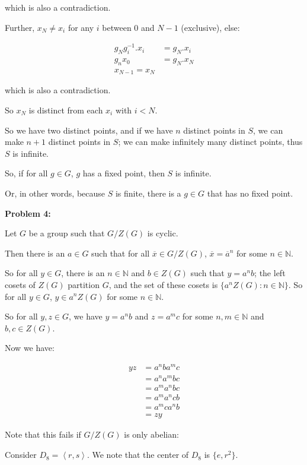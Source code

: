\documentclass[a4paper,12pt]{article}
\newcommand{\tab}{\hspace{4mm}} %
\newcommand{\shunt}{\vspace{20mm}}
\newcommand{\anbrack}[1]{\left\langle #1 \right\rangle}
\newcommand{\N}{\mathbb{N}}
\begin{document}
\tab which is also a contradiction.

\tab Further, $x_N \neq x_{i}$ for any $i$ between $0$ and $N-1$ (exclusive), else:

\begin{align*}
g_Ng_i^{-1}.x_i &= g_N.x_i\\
g_nx_0 &= g_N.x_N\\
x_{N-1} = x_N
\end{align*} 

\tab which is also a contradiction.

\tab So $x_N$ is distinct from each $x_i$ with $i < N$.

\tab So we have two distinct points, and if we have $n$ distinct points in $S$, we can make $n+1$ distinct points in $S$; we can make infinitely many distinct points, thus $S$ is infinite.

So, if for all $g \in G$, $g$ has a fixed point, then $S$ is infinite.

Or, in other words, because $S$ is finite, there is a $g \in G$ that has no fixed point.

\shunt

{\bf Problem 4:}

Let $G$ be a group such that $G/Z(G)$ is cyclic.

Then there is an $a \in G$ such that for all $\overline{x} \in G/Z(G)$, $\overline{x} = \overline{a}^n$ for some $n \in \N$.

So for all $y \in G$, there is an $n \in \N$ and $b \in Z(G)$ such that $y = a^nb$; the left cosets of $Z(G)$ partition $G$, and the set of these cosets is $\{a^nZ(G): n \in \N\}$. So for all $y \in G$, $y \in a^nZ(G)$ for some $n \in \N$. 

So for all $y, z \in G$, we have $y = a^nb$ and $z=a^mc$ for some $n,m \in \N$ and $b,c \in Z(G)$.

Now we have:

\begin{align*}
yz &= a^nba^mc\\
&=a^na^mbc\\
&=a^ma^nbc\\
&=a^ma^ncb\\
&=a^mca^nb\\
&=zy
\end{align*}

Note that this fails if $G/Z(G)$ is only abelian:

\tab Consider $D_8=\anbrack{r,s}$. We note that the center of $D_8$ is $\{e,r^2\}$.
\end{document}
